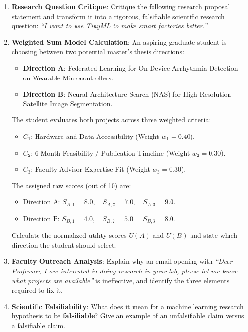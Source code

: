\begin{checkyourself}
\begin{enumerate}
    \item \textbf{Research Question Critique}: Critique the following research proposal statement and transform it into a rigorous, falsifiable scientific research question: \emph{``I want to use TinyML to make smart factories better.''}
    \item \textbf{Weighted Sum Model Calculation}: An aspiring graduate student is choosing between two potential master's thesis directions:
    \begin{itemize}
        \item \textbf{Direction A}: Federated Learning for On-Device Arrhythmia Detection on Wearable Microcontrollers.
        \item \textbf{Direction B}: Neural Architecture Search (NAS) for High-Resolution Satellite Image Segmentation.
    \end{itemize}
    The student evaluates both projects across three weighted criteria:
    \begin{itemize}
        \item $C_1$: Hardware and Data Accessibility (Weight $w_1 = 0.40$).
        \item $C_2$: 6-Month Feasibility / Publication Timeline (Weight $w_2 = 0.30$).
        \item $C_3$: Faculty Advisor Expertise Fit (Weight $w_3 = 0.30$).
    \end{itemize}
    The assigned raw scores (out of 10) are:
    \begin{itemize}
        \item Direction A: $S_{A,1} = 8.0, \quad S_{A,2} = 7.0, \quad S_{A,3} = 9.0$.
        \item Direction B: $S_{B,1} = 4.0, \quad S_{B,2} = 5.0, \quad S_{B,3} = 8.0$.
    \end{itemize}
    Calculate the normalized utility scores $U(A)$ and $U(B)$ and state which direction the student should select.
    \item \textbf{Faculty Outreach Analysis}: Explain why an email opening with \emph{``Dear Professor, I am interested in doing research in your lab, please let me know what projects are available''} is ineffective, and identify the three elements required to fix it.
    \item \textbf{Scientific Falsifiability}: What does it mean for a machine learning research hypothesis to be \textbf{falsifiable}? Give an example of an unfalsifiable claim versus a falsifiable claim.
\end{enumerate}
\end{checkyourself}

